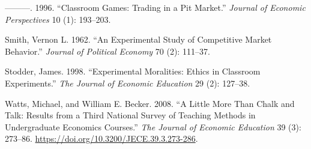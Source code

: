 \documentclass[
]{article}
\newlength{\cslhangindent}
\newlength{\cslentryspacingunit} %
\newenvironment{CSLReferences}[2] %
 {%
  \setlength{\parindent}{0pt}
  \ifodd #1
  \let\oldpar\par
  \def\par{\hangindent=\cslhangindent\oldpar}
  \fi
  \setlength{\parskip}{#2\cslentryspacingunit}
 }%
 {}
\begin{document}
\begin{CSLReferences}{1}{0}
\leavevmode{}%
---------. 1996. {``Classroom Games: {Trading} in a Pit Market.''}
\emph{Journal of Economic Perspectives} 10 (1): 193--203.

\leavevmode{}%
Smith, Vernon L. 1962. {``An Experimental Study of Competitive Market
Behavior.''} \emph{Journal of Political Economy} 70 (2): 111--37.

\leavevmode{}%
Stodder, James. 1998. {``Experimental Moralities: {Ethics} in Classroom
Experiments.''} \emph{The Journal of Economic Education} 29 (2):
127--38.

\leavevmode{}%
Watts, Michael, and William E. Becker. 2008. {``A {Little} {More} Than
{Chalk} and {Talk}: {Results} from a {Third} {National} {Survey} of
{Teaching} {Methods} in {Undergraduate} {Economics} {Courses}.''}
\emph{The Journal of Economic Education} 39 (3): 273--86.
\url{https://doi.org/10.3200/JECE.39.3.273-286}.

\end{CSLReferences}
\end{document}

